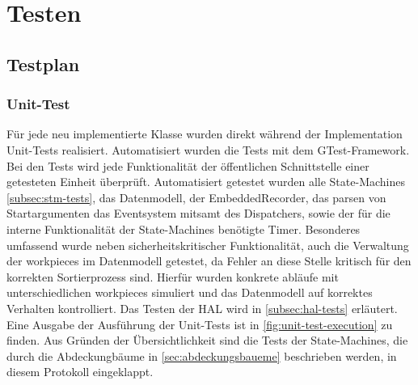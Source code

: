 \chapter{Testen}\label{ch:testen}



\section{Testplan}\label{sec:testplan}




\subsection{Unit-Test}\label{subsec:unit-tests}
Für jede neu implementierte Klasse wurden direkt während der Implementation Unit-Tests realisiert.
Automatisiert wurden die Tests mit dem GTest-Framework.
Bei den Tests wird jede Funktionalität der öffentlichen Schnittstelle einer getesteten Einheit überprüft.
Automatisiert getestet wurden alle State-Machines \ref{subsec:stm-tests}, das Datenmodell, der EmbeddedRecorder, das parsen von Startargumenten
das Eventsystem mitsamt des Dispatchers, sowie der für die interne Funktionalität der State-Machines benötigte Timer.
Besonderes umfassend wurde neben sicherheitskritischer Funktionalität, auch die Verwaltung der \glspl{workpiece} im Datenmodell getestet,
da Fehler an diese Stelle kritisch für den korrekten Sortierprozess sind.
Hierfür wurden konkrete abläufe mit unterschiedlichen \glspl{workpiece} simuliert
und das Datenmodell auf korrektes Verhalten kontrolliert.
Das Testen der HAL wird in \ref{subsec:hal-tests} erläutert.
Eine Ausgabe der Ausführung der Unit-Tests ist in \ref{fig:unit-test-execution} zu finden.
Aus Gründen der Übersichtlichkeit sind die Tests der State-Machines, die durch die Abdeckungbäume in \ref{sec:abdeckungsbaueme} beschrieben werden, in diesem Protokoll eingeklappt.


